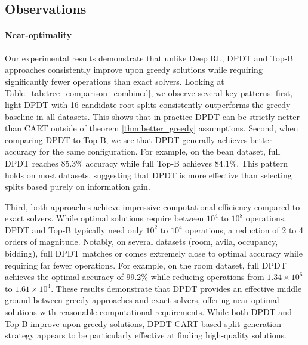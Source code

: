 \subsection{Observations}

\paragraph{Near-optimality} Our experimental results demonstrate that unlike Deep RL, DPDT and Top-B approaches consistently improve upon greedy solutions while requiring significantly fewer operations than exact solvers. Looking at Table~\ref{tab:tree_comparison_combined}, we observe several key patterns:
first, light DPDT with 16 candidate root splits consistently outperforms the greedy baseline in all datasets. This shows that in practice DPDT can be strictly netter than CART outside of theorem \ref{thm:better_greedy} assumptions. 
Second, when comparing DPDT to Top-B, we see that DPDT generally achieves better accuracy for the same configuration. For example, on the bean dataset, full DPDT reaches 85.3\% accuracy while full Top-B achieves 84.1\%. This pattern holds on most datasets, suggesting that DPDT is more effective than selecting splits based purely on information gain.


Third, both approaches achieve impressive computational efficiency compared to exact solvers. While optimal solutions require between $10^4$ to $10^8$ operations, DPDT and Top-B typically need only $10^2$ to $10^4$ operations, a reduction of 2 to 4 orders of magnitude.
Notably, on several datasets (room, avila, occupancy, bidding), full DPDT matches or comes extremely close to optimal accuracy while requiring far fewer operations. For example, on the room dataset, full DPDT achieves the optimal accuracy of 99.2\% while reducing operations from $1.34\times10^6$ to $1.61\times10^4$.
These results demonstrate that DPDT provides an effective middle ground between greedy approaches and exact solvers, offering near-optimal solutions with reasonable computational requirements. While both DPDT and Top-B improve upon greedy solutions, DPDT CART-based split generation strategy appears to be particularly effective at finding high-quality solutions.

